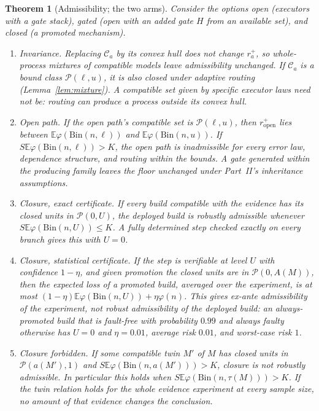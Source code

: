 \documentclass[11pt]{article}
\newtheorem{theorem}{Theorem}
\theoremstyle{definition}
\theoremstyle{remark}
\newcommand{\E}{\mathbb E}
\newcommand{\Bin}{\mathrm{Bin}}
\begin{document}
\begin{theorem}[Admissibility; the two arms]\label{thm:admissible}
Consider the options \emph{open} (executors with a gate stack), \emph{gated} (open with an added gate
$H$ from an available set), and \emph{closed} (a promoted mechanism).
\begin{enumerate}[label=(\roman*),itemsep=2pt]
\item \emph{Invariance.} Replacing $\mathcal C_a$ by its convex hull does not change $r_a^+$, so
whole-process mixtures of compatible models leave admissibility unchanged. If $\mathcal C_a$ is a bound
class $\mathcal P(\ell,u)$, it is also closed under adaptive routing (Lemma~\ref{lem:mixture}). A compatible
set given by specific executor laws need not be: routing can produce a process outside its convex hull.
\item \emph{Open path.} If the open path's compatible set is $\mathcal P(\ell,u)$, then
$r_{\mathrm{open}}^+$ lies between $\E\varphi(\Bin(n,\ell))$ and $\E\varphi(\Bin(n,u))$. If
$S\E\varphi(\Bin(n,\ell))>K$, the open path is inadmissible for every error law, dependence structure,
and routing within the bounds. A gate generated within the producing family leaves the floor unchanged
under Part~II's inheritance assumptions.
\item \emph{Closure, exact certificate.} If every build compatible with the evidence has its closed units
in $\mathcal P(0,U)$, the deployed build is robustly admissible whenever $S\E\varphi(\Bin(n,U))\le K$.
A fully determined step checked exactly on every branch gives this with $U=0$.
\item \emph{Closure, statistical certificate.} If the step is verifiable at level $U$ with confidence
$1-\eta$, and given promotion the closed units are in $\mathcal P(0,A(M))$, then the expected loss of a
promoted build, averaged over the experiment, is at most $(1-\eta)\E\varphi(\Bin(n,U))+\eta\varphi(n)$.
This gives ex-ante admissibility of the experiment, not robust admissibility of the deployed build: an
always-promoted build that is fault-free with probability $0.99$ and always faulty otherwise has
$U=0$ and $\eta=0.01$, average risk $0.01$, and worst-case risk $1$.
\item \emph{Closure forbidden.} If some compatible twin $M'$ of $M$ has closed units in
$\mathcal P(a(M'),1)$ and $S\E\varphi(\Bin(n,a(M')))>K$, closure is not robustly admissible. In
particular this holds when $S\E\varphi(\Bin(n,\tau(M)))>K$. If the twin relation holds for the whole
evidence experiment at every sample size, no amount of that evidence changes the conclusion.

\end{enumerate}
\end{theorem}
\end{document}
